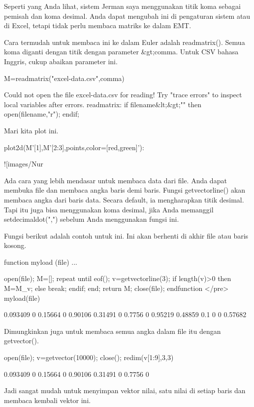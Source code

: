 \documentclass{article}
\begin{document}
Seperti yang Anda lihat, sistem Jerman saya menggunakan titik koma
sebagai pemisah dan koma desimal. Anda dapat mengubah ini di
pengaturan sistem atau di Excel, tetapi tidak perlu membaca matriks ke
dalam EMT.


Cara termudah untuk membaca ini ke dalam Euler adalah readmatrix().
Semua koma diganti dengan titik dengan parameter &gt;comma. Untuk CSV
bahasa Inggris, cukup abaikan parameter ini.


\>M=readmatrix("excel-data.csv",\>comma)


    Could not open the file
    excel-data.csv
    for reading!
    Try "trace errors" to inspect local variables after errors.
    readmatrix:
        if filename&lt;&gt;"" then open(filename,"r"); endif;

Mari kita plot ini.


\>plot2d(M'[1],M'[2:3],\>points,color=[red,green]'):


![images/Nur%

Ada cara yang lebih mendasar untuk membaca data dari file. Anda dapat
membuka file dan membaca angka baris demi baris. Fungsi
getvectorline() akan membaca angka dari baris data. Secara default, ia
mengharapkan titik desimal. Tapi itu juga bisa menggunakan koma
desimal, jika Anda memanggil setdecimaldot(",") sebelum Anda
menggunakan fungsi ini.


Fungsi berikut adalah contoh untuk ini. Ini akan berhenti di akhir
file atau baris kosong.


\>function myload (file) ...


    open(file);
    M=[];
    repeat
       until eof();
       v=getvectorline(3);
       if length(v)>0 then M=M_v; else break; endif;
    end;
    return M;
    close(file);
    endfunction
</pre>
\>myload(file)


     0.093409         0   0.15664         0   0.90106 
      0.31491         0    0.7756         0   0.95219 
      0.48859       0.1         0         0   0.57682 

Dimungkinkan juga untuk membaca semua angka dalam file itu dengan
getvector().


\>open(file); v=getvector(10000); close(); redim(v[1:9],3,3)


     0.093409         0   0.15664 
            0   0.90106   0.31491 
            0    0.7756         0 

Jadi sangat mudah untuk menyimpan vektor nilai, satu nilai di setiap
baris dan membaca kembali vektor ini.
\end{document}
